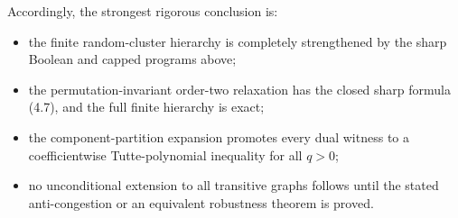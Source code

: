 \documentclass[11pt]{article}
\theoremstyle{definition}
\theoremstyle{remark}
\begin{document}
Accordingly, the strongest rigorous conclusion is:
\begin{itemize}[leftmargin=2em]
\item the finite random-cluster hierarchy is completely strengthened by
      the sharp Boolean and capped programs above;
\item the permutation-invariant order-two relaxation has the closed sharp
      formula (4.7), and the full finite hierarchy is exact;
\item the component-partition expansion promotes every dual witness to a
      coefficientwise Tutte-polynomial inequality for all $q>0$;
\item no unconditional extension to all transitive graphs follows until
      the stated anti-congestion or an equivalent robustness theorem is
      proved.
\end{itemize}
\end{document}
